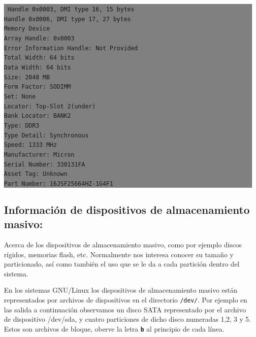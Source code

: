 \documentclass[12pt]{article}
\begin{document}
\colorbox{grey}{\parbox[t]{0.95\linewidth}{ \vspace*{0.5cm} { 
{\tt
Handle 0x0003, DMI type 16, 15 bytes\\
Handle 0x0006, DMI type 17, 27 bytes\\
Memory Device\\
	Array Handle: 0x0003\\
	Error Information Handle: Not Provided\\
	Total Width: 64 bits\\
	Data Width: 64 bits\\
	Size: 2048 MB\\
	Form Factor: SODIMM\\
	Set: None\\
	Locator: Top-Slot 2(under)\\
	Bank Locator: BANK2\\
	Type: DDR3\\
	Type Detail: Synchronous\\
	Speed: 1333 MHz\\
	Manufacturer: Micron\\
	Serial Number: 330131FA\\
	Asset Tag: Unknown\\
	Part Number: 16JSF25664HZ-1G4F1\\
}
} \vspace*{0.5cm} } } 

\subsection*{Información de dispositivos de almacenamiento masivo:}

Acerca de los dispositivos de almacenamiento masivo, como por ejemplo discos rígidos, memorias
flash, etc. Normalmente nos interesa conocer su tamaño y particionado, así como también el uso 
que se le da a cada partición dentro del sistema.  

En los sistemas GNU/Linux los dispositivos de almacenamiento masivo están representados por 
archivos de dispositivos en el directorio \texttt{/dev/}. Por ejemplo en las salida a continuación 
observamos un disco SATA representado por el archivo de dispositivo /dev/sda, y cuatro 
particiones de dicho disco numeradas 1,2, 3 y 5. Estos son archivos de bloque, oberve la letra 
\textbf{\texttt{b}} al principio de cada línea. 
\end{document}
